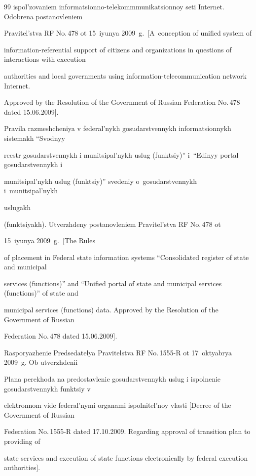 {{\begin{thebibliography}{99}
ispol'zovaniem informatsionno-telekommmunikatsionnoy seti Internet. Odobrena postanovleniem

Pravitel'stva RF No.\,478 ot 15~iyunya 2009~g.\ [A~conception of unified system of

information-referential support of citizens and organizations in questions of interactions with execution

authorities and local governments using information-telecommunication network Internet.

Approved by the Resolution of the Government of Russian Federation No.\,478 dated 15.06.2009].






Pravila razmeshcheniya v federal'nykh gosudarstvennykh informatsionnykh sistemakh ``Svodnyy

reestr gosudarstvennykh i munitsipal'nykh uslug (funktsiy)'' i~``Edinyy portal gosudarstvennykh i

munitsipal'nykh uslug (funktsiy)'' svedeniy o~gosudarstvennykh i~munitsipal'nykh

uslugakh

(funktsiyakh). Utverzhdeny postanovleniem Pravitel'stva RF No.\,478 ot

15~iyunya 2009~g.\ [The Rules

of placement in Federal state information systems ``Consolidated register of state and municipal

services (functions)'' and ``Unified portal of state and municipal services (functions)'' of state and

municipal services (functions) data. Approved by the Resolution of the Government of Russian

Federation No.\,478 dated 15.06.2009].




Rasporyazhenie Predsedatelya Pravitelstva RF No.\,1555-R ot 17~oktyabrya 2009~g. Ob utverzhdenii

Plana perekhoda na predostavlenie gosudarstvennykh uslug i ispolnenie gosudarstvennykh funktsiy v

elektronnom vide federal'nymi organami ispolnitel'noy vlasti [Decree of the Government of Russian

Federation No.\,1555-R dated 17.10.2009. Regarding approval of transition plan to providing of

state services and execution of state functions electronically by federal execution authorities].




\end{thebibliography}}}
